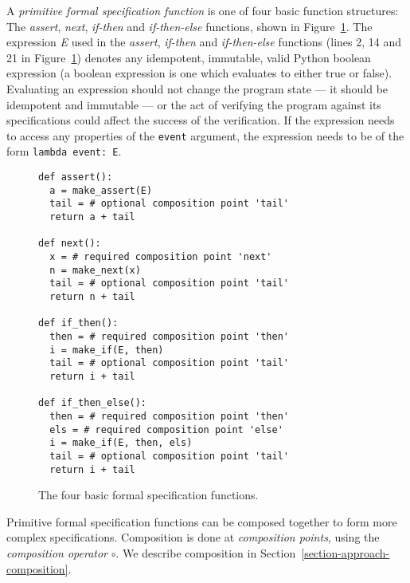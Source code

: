 A \textit{primitive formal specification function} is one of four basic
function structures: The \textit{assert}, \textit{next}, \textit{if-then} and
\textit{if-then-else} functions, shown in
Figure~\ref{figure-basic-formal-specification-functions}. The expression
\textit{E} used in the \textit{assert}, \textit{if-then} and
\textit{if-then-else} functions (lines 2, 14 and 21 in
Figure~\ref{figure-basic-formal-specification-functions}) denotes any
idempotent, immutable, valid Python boolean expression (a boolean expression is
one which evaluates to either true or false). Evaluating an expression should
not change the program state --- it should be idempotent and immutable --- or
the act of verifying the program against its specifications could affect the
success of the verification. If the expression needs to access any properties
of the \texttt{event} argument, the expression needs to be of the form
\texttt{lambda event: E}.

\begin{figure}[h!]
	\begin{center}
	\begin{minipage}{0.7\textwidth}
	\begin{lstlisting}
def assert():
  a = make_assert(E)
  tail = # optional composition point 'tail'
  return a + tail

def next():
  x = # required composition point 'next'
  n = make_next(x)
  tail = # optional composition point 'tail'
  return n + tail

def if_then():
  then = # required composition point 'then'
  i = make_if(E, then)
  tail = # optional composition point 'tail'
  return i + tail

def if_then_else():
  then = # required composition point 'then'
  els = # required composition point 'else'
  i = make_if(E, then, els)
  tail = # optional composition point 'tail'
  return i + tail
	\end{lstlisting}
	\end{minipage}
	\end{center}

	\caption{The four basic formal specification functions.}
	\label{figure-basic-formal-specification-functions}
\end{figure}

Primitive formal specification functions can be composed together to form more
complex specifications. Composition is done at \textit{composition points},
using the \textit{composition operator} $\circ$. We describe composition in
Section~\ref{section-approach-composition}.


